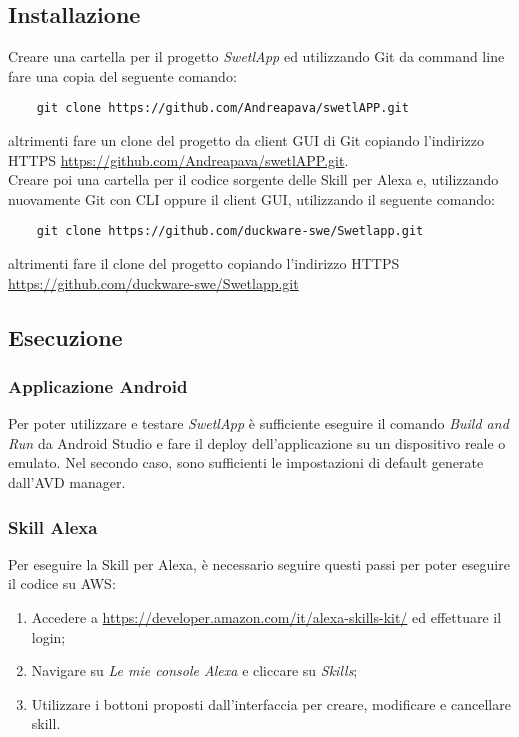 \subsection{Installazione}
Creare una cartella per il progetto \textit{SwetlApp} ed utilizzando Git da command line fare una copia del seguente comando:
\begin{verbatim}
    git clone https://github.com/Andreapava/swetlAPP.git
\end{verbatim}
altrimenti fare un clone del progetto da client GUI di Git copiando l'indirizzo HTTPS \href{https://github.com/Andreapava/swetlAPP.git}{https://github.com/Andreapava/swetlAPP.git}.\\Creare poi una cartella per il codice sorgente delle Skill per Alexa e, utilizzando nuovamente Git con CLI oppure il client GUI, utilizzando il seguente comando:
\begin{verbatim}
    git clone https://github.com/duckware-swe/Swetlapp.git
\end{verbatim}
altrimenti fare il clone del progetto copiando l'indirizzo HTTPS \href{https://github.com/duckware-swe/Swetlapp.git}{https://github.com/duckware-swe/Swetlapp.git}

\subsection{Esecuzione}
\subsubsection{Applicazione Android}
Per poter utilizzare e testare \textit{SwetlApp} è sufficiente eseguire il comando \emph{Build and Run} da Android Studio e fare il deploy dell'applicazione su un dispositivo reale o emulato. Nel secondo caso, sono sufficienti le impostazioni di default generate dall'AVD manager.
\subsubsection{Skill Alexa}
Per eseguire la Skill per Alexa, è necessario seguire questi passi per poter eseguire il codice su AWS:
\begin{enumerate}
    \item Accedere a \url{https://developer.amazon.com/it/alexa-skills-kit/} ed effettuare il login;
    \item Navigare su \emph{Le mie console Alexa} e cliccare su \emph{Skills};
    \item Utilizzare i bottoni proposti dall'interfaccia per creare, modificare e cancellare skill.
\end{enumerate}